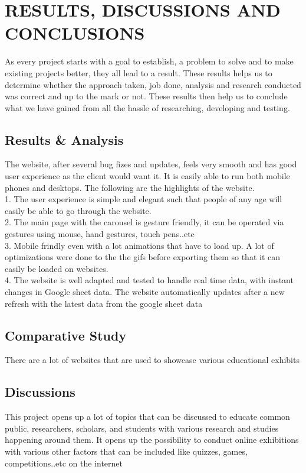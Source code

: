  \chapter{RESULTS, DISCUSSIONS AND CONCLUSIONS} %
\label{ChapterResults} %
As every project starts with a goal to establish, a problem to solve and to make existing
projects better, they all lead to a result. These results helps us to determine whether the
approach taken, job done, analysis and research conducted was correct and up to the
mark or not. These results then help us to conclude what we have gained from all the
hassle of researching, developing and testing.

\section{Results \& Analysis}
The website, after several bug fizes and updates, feels very smooth and has good user experience as the client would want it. It is easily able to run both mobile phones and desktops. The following are the highlights of the website.
\\
1. The user experience is simple and elegant such that people of any age will easily be able to go through the website. 
\\
2. The main page with the carousel is gesture friendly, it can be operated via gestures using mouse, hand gestures, touch pens..etc   
\\
3. Mobile frindly even with a lot animations that have to load up. A lot of optimizations were done to the the gifs before exporting them so that it can easily be loaded on websites.
\\
4. The website is well adapted and tested to handle real time data, with instant changes in Google sheet data. The website automatically updates after a new refresh with the latest data from the google sheet data


\section{Comparative Study}
There are a lot of websites that are used to showcase various educational exhibits

\section{Discussions}
This project opens up a lot of topics that can be discussed to educate common public, researchers, scholars, and students with various research and studies happening around them. It opens up the possibility to conduct online exhibitions with various other factors that can be included like quizzes, games, competitions..etc on  the internet 

